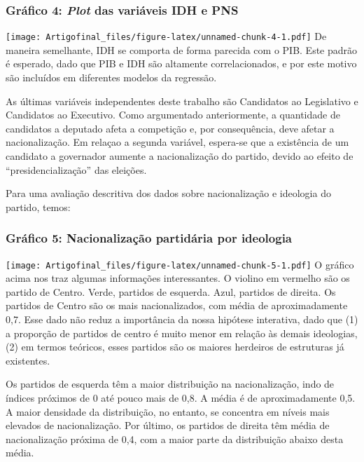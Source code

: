 \documentclass[]{article}
\begin{document}
\subsubsection{\texorpdfstring{Gráfico 4: \emph{Plot} das variáveis IDH
e
PNS}{Gráfico 4: Plot das variáveis IDH e PNS}}\label{grafico-4-plot-das-variaveis-idh-e-pns}

\texttt{[image: Artigofinal\_files/figure-latex/unnamed-chunk-4-1.pdf]}
De maneira semelhante, IDH se comporta de forma parecida com o PIB. Este
padrão é esperado, dado que PIB e IDH são altamente correlacionados, e
por este motivo são incluídos em diferentes modelos da regressão.

As últimas variáveis independentes deste trabalho são Candidatos ao
Legislativo e Candidatos ao Executivo. Como argumentado anteriormente, a
quantidade de candidatos a deputado afeta a competição e, por
consequência, deve afetar a nacionalização. Em relaçao a segunda
variável, espera-se que a existência de um candidato a governador
aumente a nacionalização do partido, devido ao efeito de
``presidencialização'' das eleições.

Para uma avaliação descritiva dos dados sobre nacionalização e ideologia
do partido, temos:

\newpage

\subsubsection{Gráfico 5: Nacionalização partidária por
ideologia}\label{grafico-5-nacionalizacao-partidaria-por-ideologia}

\texttt{[image: Artigofinal\_files/figure-latex/unnamed-chunk-5-1.pdf]} O
gráfico acima nos traz algumas informações interessantes. O violino em
vermelho são os partido de Centro. Verde, partidos de esquerda. Azul,
partidos de direita. Os partidos de Centro são os mais nacionalizados,
com média de aproximadamente 0,7. Esse dado não reduz a importância da
nossa hipótese interativa, dado que (1) a proporção de partidos de
centro é muito menor em relação às demais ideologias, (2) em termos
teóricos, esses partidos são os maiores herdeiros de estruturas já
existentes.

Os partidos de esquerda têm a maior distribuição na nacionalização, indo
de índices próximos de 0 até pouco mais de 0,8. A média é de
aproximadamente 0,5. A maior densidade da distribuição, no entanto, se
concentra em níveis mais elevados de nacionalização. Por último, os
partidos de direita têm média de nacionalização próxima de 0,4, com a
maior parte da distribuição abaixo desta média.
\end{document}
